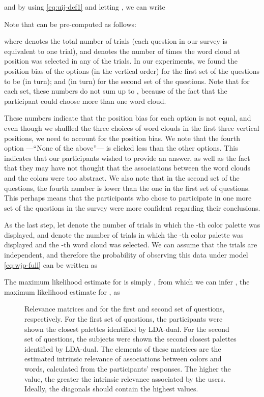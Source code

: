 \documentclass[prodmode,acmtochi]{acmsmall}
\begin{document}
and by using \eqref{eq:uij-def1} and letting , we can write

Note that  can be pre-computed as follows:

where  denotes the total number of trials (each question in our
survey is equivalent to one trial), and  denotes the number of
times the word cloud at position  was selected in any of the
trials.
In our experiments, we found the position bias of the options (in the vertical order) for the first set of the questions to be  (in turn); and  (in turn) for the second set of the questions. Note that for each set, these numbers do not sum up to , because of the fact that the participant could choose more than one word cloud.

These numbers indicate that the position bias for each option is not equal, and even though we shuffled the three choices of word clouds in the first three vertical positions, we need to account for the position bias. We note that the fourth option ---``None of the above''--- is clicked less than the other options. This indicates that our participants wished to provide an answer, as well as the fact that they may have not thought that the associations between the word clouds and the colors were too abstract. We also note that in the second set of the questions, the fourth number is lower than the one in the first set of questions. This perhaps means that the participants who chose to participate in one more set of the questions in the survey were more confident regarding their conclusions.

As the last step, let  denote the number of trials in which the -th color
palette was displayed, and  denote the number of trials in which
the -th color palette was displayed and the -th word cloud was
selected. We can assume that the trials are independent, and therefore
the probability of observing this data under model \eqref{eq:wjp-full}
can be written as

The maximum likelihood estimate for  is simply
, from which we can infer , the
maximum likelihood estimate for , as


\begin{figure}[h!tb]
  \centering
  \caption{Relevance matrices  and  for the first and second set
    of questions, respectively. For the first set of questions, the participants were shown the closest palettes identified by LDA-dual. For the second set of questions, the subjects were shown the second closest palettes identified by LDA-dual. The elements of these matrices are the
    estimated intrinsic relevance of associations between colors and
    words, calculated from the participants' responses. The higher the
    value, the greater the intrinsic relevance associated by the users.
    Ideally, the diagonals should contain the highest values. }
  \label{confusionMatrices}
\end{figure}
\end{document}
